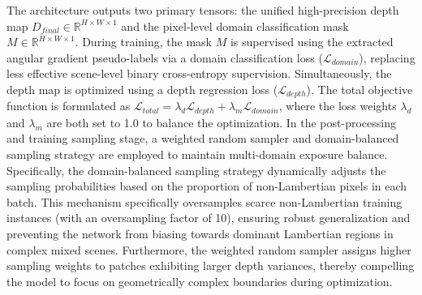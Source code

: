 \documentclass[lettersize,journal]{IEEEtran}
\begin{document}
The architecture outputs two primary tensors: the unified high-precision depth map $D_{final} \in \mathbb{R}^{H \times W \times 1}$ and the pixel-level domain classification mask $M \in \mathbb{R}^{H \times W \times 1}$. During training, the mask $M$ is supervised using the extracted angular gradient pseudo-labels via a domain classification loss ($\mathcal{L}_{domain}$), replacing less effective scene-level binary cross-entropy supervision. Simultaneously, the depth map is optimized using a depth regression loss ($\mathcal{L}_{depth}$). The total objective function is formulated as $\mathcal{L}_{total} = \lambda_d \mathcal{L}_{depth} + \lambda_m \mathcal{L}_{domain}$, where the loss weights $\lambda_d$ and $\lambda_m$ are both set to 1.0 to balance the optimization. In the post-processing and training sampling stage, a weighted random sampler and domain-balanced sampling strategy are employed to maintain multi-domain exposure balance. Specifically, the domain-balanced sampling strategy dynamically adjusts the sampling probabilities based on the proportion of non-Lambertian pixels in each batch. This mechanism specifically oversamples scarce non-Lambertian training instances (with an oversampling factor of 10), ensuring robust generalization and preventing the network from biasing towards dominant Lambertian regions in complex mixed scenes. Furthermore, the weighted random sampler assigns higher sampling weights to patches exhibiting larger depth variances, thereby compelling the model to focus on geometrically complex boundaries during optimization.
\end{document}
